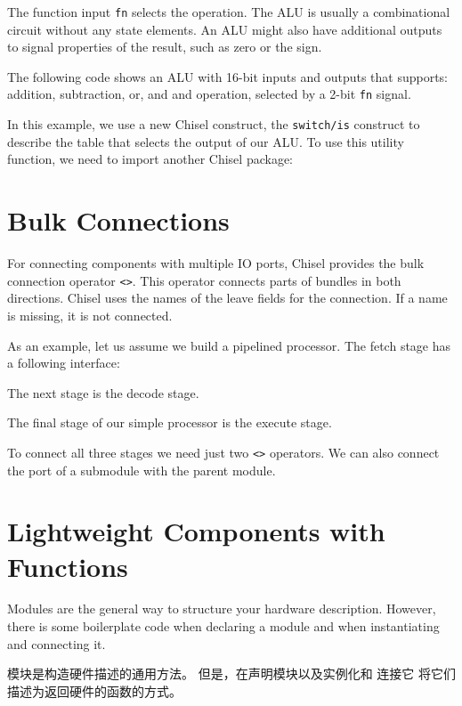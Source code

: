 \documentclass[%
    10pt,
    headinclude, footexclude,
    openright, %
    notitlepage,
    cleardoubleempty,
    headsepline,
    pointlessnumbers,
    bibtotoc, idxtotoc,
    ]{scrbook}
\newcommand{\code}[1]{{\small{\texttt{#1}}}}
\begin{document}
The function input \code{fn} selects the operation. The ALU is usually a combinational
circuit without any state elements. An ALU might also have additional outputs to signal properties
of the result, such as zero or the sign.

The following code shows an ALU with 16-bit inputs and outputs that supports: addition, subtraction, or, and and
operation, selected by a 2-bit \code{fn} signal.


\noindent In this example, we use a new Chisel construct, the \code{switch/is} construct to describe
the table that selects the output of our ALU.
To use this utility function, we need to import another Chisel package:


\section{Bulk Connections}

For connecting components with multiple IO ports, Chisel provides the
bulk connection operator \code{<>}. This operator connects parts of bundles
in both directions. Chisel uses the names of the leave fields for the connection.
If a name is missing, it is not connected.

As an example, let us assume we build a pipelined processor. The fetch
stage has a following interface:

\noindent The next stage is the decode stage.

\noindent The final stage of our simple processor is the execute stage.

To connect all three stages we need just two \code{<>} operators.
We can also connect the port of a submodule with the parent module.


\section{Lightweight Components with Functions}

Modules are the general way to structure your hardware description.
However, there is some boilerplate code when declaring a module and when instantiating and
connecting it.


模块是构造硬件描述的通用方法。
但是，在声明模块以及实例化和
连接它
将它们描述为返回硬件的函数的方式。
\end{document}
